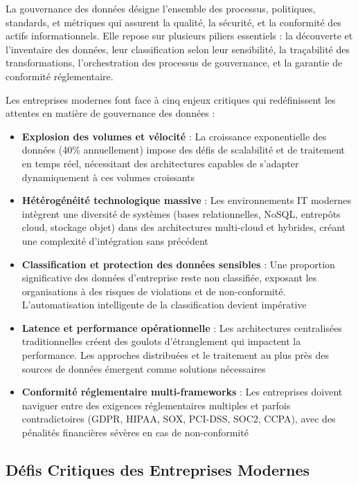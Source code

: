 La gouvernance des données désigne l'ensemble des processus, politiques, standards, et métriques qui assurent la qualité, la sécurité, et la conformité des actifs informationnels. Elle repose sur plusieurs piliers essentiels : la découverte et l'inventaire des données, leur classification selon leur sensibilité, la traçabilité des transformations, l'orchestration des processus de gouvernance, et la garantie de conformité réglementaire.

Les entreprises modernes font face à cinq enjeux critiques qui redéfinissent les attentes en matière de gouvernance des données :

\begin{itemize}
    \item \textbf{Explosion des volumes et vélocité} : La croissance exponentielle des données (40\% annuellement) impose des défis de scalabilité et de traitement en temps réel, nécessitant des architectures capables de s'adapter dynamiquement à ces volumes croissants
    
    \item \textbf{Hétérogénéité technologique massive} : Les environnements IT modernes intègrent une diversité de systèmes (bases relationnelles, NoSQL, entrepôts cloud, stockage objet) dans des architectures multi-cloud et hybrides, créant une complexité d'intégration sans précédent
    
    \item \textbf{Classification et protection des données sensibles} : Une proportion significative des données d'entreprise reste non classifiée, exposant les organisations à des risques de violations et de non-conformité. L'automatisation intelligente de la classification devient impérative
    
    \item \textbf{Latence et performance opérationnelle} : Les architectures centralisées traditionnelles créent des goulots d'étranglement qui impactent la performance. Les approches distribuées et le traitement au plus près des sources de données émergent comme solutions nécessaires
    
    \item \textbf{Conformité réglementaire multi-frameworks} : Les entreprises doivent naviguer entre des exigences réglementaires multiples et parfois contradictoires (GDPR, HIPAA, SOX, PCI-DSS, SOC2, CCPA), avec des pénalités financières sévères en cas de non-conformité
\end{itemize}

\subsection{Défis Critiques des Entreprises Modernes}

